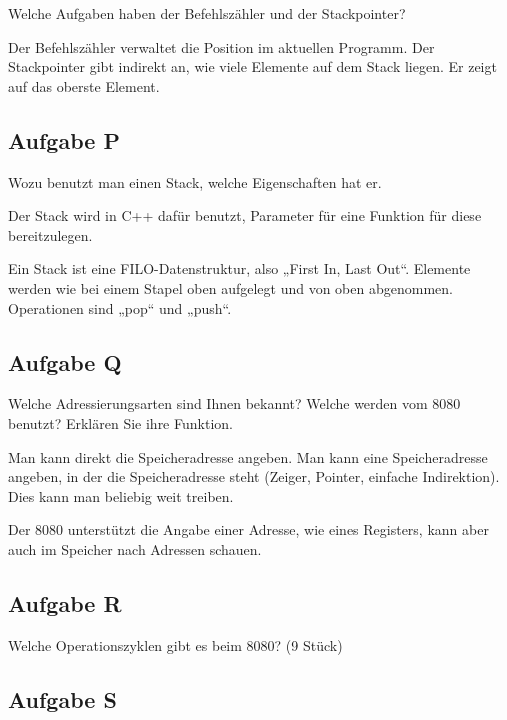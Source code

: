 \begin{problem}
	Welche Aufgaben haben der Befehlszähler und der Stackpointer?
\end{problem}

Der Befehlszähler verwaltet die Position im aktuellen Programm. Der
Stackpointer gibt indirekt an, wie viele Elemente auf dem Stack liegen. Er
zeigt auf das oberste Element.

\subsection{Aufgabe P}

\begin{problem}
	Wozu benutzt man einen Stack, welche Eigenschaften hat er.
\end{problem}

Der Stack wird in C++ dafür benutzt, Parameter für eine Funktion für diese
bereitzulegen.

Ein Stack ist eine FILO-Datenstruktur, also „First In, Last Out“. Elemente
werden wie bei einem Stapel oben aufgelegt und von oben abgenommen. Operationen
sind „pop“ und „push“.

\subsection{Aufgabe Q}

\begin{problem}
	Welche Adressierungsarten sind Ihnen bekannt? Welche werden vom 8080
	benutzt? Erklären Sie ihre Funktion.
\end{problem}

Man kann direkt die Speicheradresse angeben. Man kann eine Speicheradresse
angeben, in der die Speicheradresse steht (Zeiger, Pointer, einfache
Indirektion). Dies kann man beliebig weit treiben.

Der 8080 unterstützt die Angabe einer Adresse, wie eines Registers, kann aber
auch im Speicher nach Adressen schauen.

\subsection{Aufgabe R}

\begin{problem}
	Welche Operationszyklen gibt es beim 8080? (9 Stück)
\end{problem}

\fehlt

\subsection{Aufgabe S}

